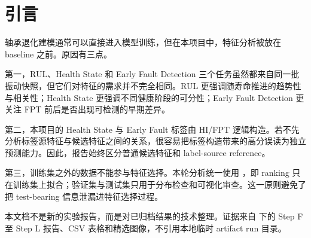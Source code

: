 \section{引言}

轴承退化建模通常可以直接进入模型训练，但在本项目中，特征分析被放在 baseline 之前。原因有三点。

第一，RUL、Health State 和 Early Fault Detection 三个任务虽然都来自同一批振动快照，但它们对特征的需求并不完全相同。RUL 更强调随寿命推进的趋势性与相关性；Health State 更强调不同健康阶段的可分性；Early Fault Detection 更关注 FPT 前后是否出现可检测的早期差异。

第二，本项目的 Health State 与 Early Fault 标签由 HI/FPT 逻辑构造。若不先分析标签源特征与候选特征之间的关系，很容易把标签构造带来的高分误读为独立预测能力。因此，报告始终区分普通候选特征和 label-source reference。

第三，训练集之外的数据不能参与特征选择。本轮分析统一使用 ，即 ranking 只在训练集上拟合；验证集与测试集只用于分布检查和可视化审查。这一原则避免了把 test-bearing 信息泄漏进特征选择过程。

本文档不是新的实验报告，而是对已归档结果的技术整理。证据来自  下的 Step F 至 Step L 报告、CSV 表格和精选图像，不引用本地临时 artifact run 目录。


